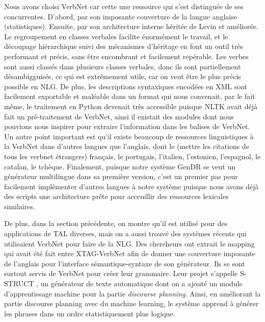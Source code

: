 Nous avons choisi VerbNet car cette une ressource qui s'est distinguée de ses concurrentes. D'abord, par son imposante couverture de la langue anglaise (statistiques). Ensuite, par son architecture interne héritée de Levin et améliorée. Le regroupement en classes verbales facilite énormément le travail, et le découpage hiérarchique suivi des mécanismes d'héritage en font un outil très performant et précis, sans être encombrant et facilement repérable. Les verbes sont aussi classés dans plusieurs classes verbales, donc ils sont partiellement désambigguisés, ce qui est extrêmement utile, car on veut être le plus précis possible en NLG. De plus, les descriptions syntaxiques encodées en XML sont facilement exportable et maléable dans un format qui nous convenait, par le fait même, le traitement en Python devenait très accessible puisque NLTK avait déjà fait un pré-traitement de VerbNet, ainsi il existait des modules dont nous pouvions nous inspirer pour extraire l'information dans les balises de VerbNet. Un autre point important est qu'il existe beaucoup de ressources linguistiques à la VerbNet dans d'autres langues que l'anglais, dont le (mettre les citations de tous les verbnet étrangers) français, le portugais, l'italien, l'estonien, l'espagnol, le catalan, le tchèque. Finalement, puisque notre système GenDR se veut un générateur multilingue dans sa première version, c'est un premier pas pour facilement implémenter d'autres langues à notre système puisque nous avons déjà des scripts une architecture prête pour acceuillir des ressources lexicales similaires. 

De plus, dans la section précédente, on montre qu'il est utilisé pour des applications de TAL diverses, mais on a aussi trouvé des systèmes récents qui utilisaient VerbNet pour faire de la NLG. Des chercheurs ont extrait le mapping qui avait été fait entre XTAG-VerbNet afin de donner une couverture imposante de l'anglais pour l'interface sémantique-syntaxe de son générateur. Ils se sont surtout servis de VerbNet pour créer leur grammaire. Leur projet s'appelle S-STRUCT \citep{PfeilAlgorithmsResourcesScalable2016}, un générateur de texte automatique dont on a ajouté un module d'apprentissage machine pour la partie \emph{discourse planning}. Ainsi, en améliorant la partie discourse planning avec du machine learning, le système apprend à générer les phrases dans un ordre statistiquement plus logique.

